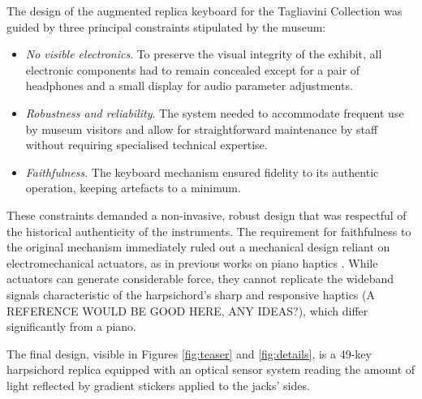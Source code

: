 The design of the augmented replica keyboard for the Tagliavini Collection was guided by three principal constraints stipulated by the museum:
\begin{itemize}
\item \emph{No visible electronics}. To preserve the visual integrity of the exhibit, all electronic components had to remain concealed except for a pair of headphones and a small display for audio parameter adjustments.
\item \emph{Robustness and reliability}. The system needed to accommodate frequent use by museum visitors and allow for straightforward maintenance by staff without requiring specialised technical expertise.
\item \emph{Faithfulness}. The keyboard mechanism ensured fidelity to its authentic operation, keeping artefacts to a minimum. 
\end{itemize}
These constraints demanded a non-invasive, robust design that was respectful of the historical authenticity of the instruments. The requirement for faithfulness to the original mechanism immediately ruled out a mechanical design reliant on electromechanical actuators, as in previous works on piano haptics \cite{Timmermans2020,Gillespie1996}. While actuators can generate considerable force, they cannot replicate the wideband signals characteristic of the harpsichord's sharp and responsive haptics (A REFERENCE WOULD BE GOOD HERE, ANY IDEAS?), which differ significantly from a piano.




The final design, visible in Figures \ref{fig:teaser} and \ref{fig:details}, is a 49-key harpsichord replica equipped with an optical sensor system reading the amount of light reflected by gradient stickers applied to the jacks' sides. 




